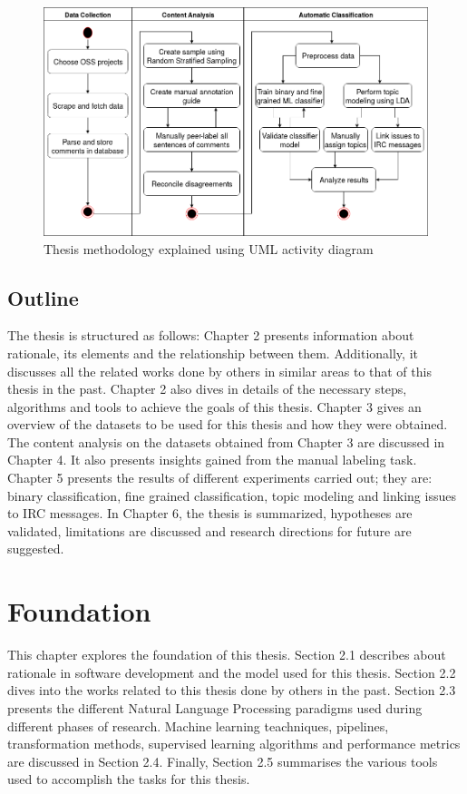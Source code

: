\documentclass[a4paper,12pt,twoside]{report}
\begin{document}
\begin{figure}[h] %
    \centering
    \includegraphics[width=13cm]{methodology}
    \caption{Thesis methodology explained using UML activity diagram}
    \label{fig:thesisMethodology}
\end{figure}

\section{Outline}
The thesis is structured as follows: Chapter 2 presents information about rationale, its elements and the relationship between them. Additionally, it discusses all the related works done by others in similar areas to that of this thesis in the past. Chapter 2 also dives in details of the necessary steps, algorithms and tools to achieve the goals of this thesis. Chapter 3 gives an overview of the datasets to be used for this thesis and how they were obtained. The content analysis on the datasets obtained from Chapter 3 are discussed in Chapter 4. It also presents insights gained from the manual labeling task. Chapter 5 presents the results of different experiments carried out; they are: binary classification, fine grained classification, topic modeling and linking issues to \acs{IRC} messages. In Chapter 6, the thesis is summarized, hypotheses are validated, limitations are discussed and research directions for future are suggested. 

\chapter{Foundation}
This chapter explores the foundation of this thesis. Section 2.1 describes about rationale in software development and the model used for this thesis. Section 2.2 dives into the works related to this thesis done by others in the past. Section 2.3 presents the different Natural Language Processing paradigms used during different phases of research. Machine learning teachniques, pipelines, transformation methods, supervised learning algorithms and performance metrics are discussed in Section 2.4. Finally, Section 2.5 summarises the various tools used to accomplish the tasks for this thesis.
\end{document}
